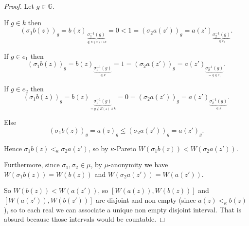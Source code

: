 \documentclass{article}
\begin{document}
\begin{proof}
  Let $g\in\mathbb G$.

  If $g\in k$ then
  \[(\sigma_1 b(z))_g=b(z)_{\underset{\notin E(z)\cup k}{\underbrace{\sigma_1^{-1}(g)}}}=0<1=(\sigma_2 a(z'))_g=a(z')_{\underset{\in e_2}{\underbrace{\sigma_2^{-1}(g)}}}.\]

  If $g\in e_1$ then
  \[(\sigma_1 b(z))_g=b(z)_{\underset{\in k}{\underbrace{\sigma_1^{-1}(g)}}}=1=(\sigma_2 a(z'))_g=a(z')_{\underset{=g\in e_1}{\underbrace{\sigma_2^{-1}(g)}}}.\]

  If $g\in e_2$ then
  \[(\sigma_1 b(z))_g=b(z)_{\underset{=g \notin E(z)\cup k}{\underbrace{\sigma_1^{-1}(g)}}}=0=(\sigma_2 a(z'))_g=a(z')_{\underset{\in k}{\underbrace{\sigma_2^{-1}(g)}}}.\]

  Else
  \[(\sigma_1 b(z))_g=a(z)_g\leq (\sigma_2 a(z'))_g=a(z')_g.\]

  Hence $\sigma_1b(z)<_\kappa \sigma_2a(z')$, so by $\kappa$-Pareto $W(\sigma_1b(z))<W(\sigma_2a(z'))$.

  Furthermore, since $\sigma_1,\sigma_2\in\mu$, by $\mu$-anonymity we have $W(\sigma_1b(z))=W(b(z))$ and $W(\sigma_2a(z'))=W(a(z'))$.

  So $W(b(z))<W(a(z'))$, so $[W(a(z)),W(b(z))]$ and $[W(a(z')),W(b(z'))]$ are disjoint and non empty (since $a(z)<_\kappa b(z)$), so to each real we can associate a unique non empty disjoint interval. That is absurd because those intervals would be countable.

\end{proof}





\end{document}
